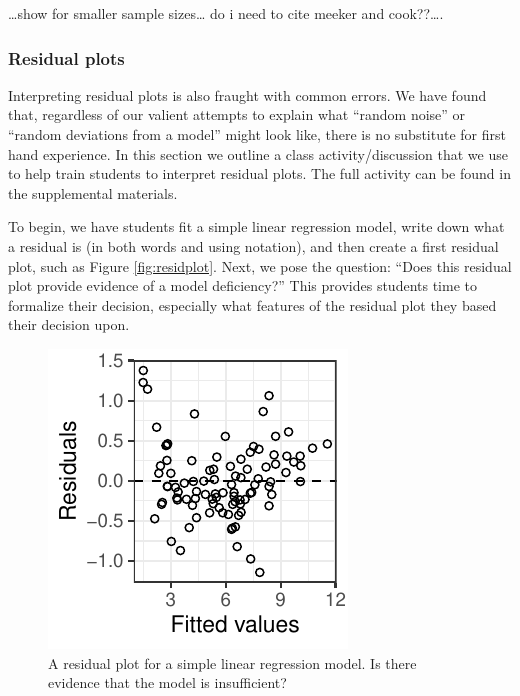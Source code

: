 \documentclass[12pt]{article}
\begin{document}
\ldots{}show for smaller sample sizes\ldots{} do i need to cite meeker
and cook??\ldots{}.

\hypertarget{residual-plots}{%
\subsubsection{Residual plots}\label{residual-plots}}

Interpreting residual plots is also fraught with common errors. We have
found that, regardless of our valient attempts to explain what ``random
noise'' or ``random deviations from a model'' might look like, there is
no substitute for first hand experience. In this section we outline a
class activity/discussion that we use to help train students to
interpret residual plots. The full activity can be found in the
supplemental materials.

To begin, we have students fit a simple linear regression model, write
down what a residual is (in both words and using notation), and then
create a first residual plot, such as Figure \ref{fig:residplot}. Next,
we pose the question: ``Does this residual plot provide evidence of a
model deficiency?'' This provides students time to formalize their
decision, especially what features of the residual plot they based their
decision upon.

\begin{figure}

{\centering \includegraphics{figs/observed_residual} 

}

\caption{\label{fig:residplot} A residual plot for a simple linear regression model. Is there evidence that the model is insufficient?}\label{fig:residual plot}
\end{figure}
\end{document}
